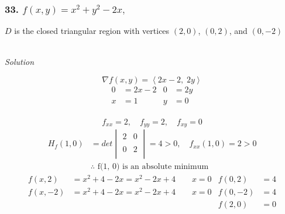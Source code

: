 \documentclass{article}
\newcommand\vv[1]{\left\langle #1 \right\rangle}
\newcommand{\solution}{\centerline{\textit{Solution}}}
\newcommand{\also}{,\quad}
\begin{document}
{{{\subsubsection*{33. $f(x,y) = x^2+y^2-2x,\quad$}
$D$ is the closed triangular
region with vertices $(2,0)$, $(0,2)$, and $(0,-2)$ \\\\
\solution
\vspace{1em}
\[
    \nabla f(x,y) = \vv{2x-2,\; 2y}
\]
\begin{align*}
    0 &= 2x- 2 & 0 &= 2y \\
    x &= 1 & y &= 0
\end{align*}
 \\
\[
    f_{xx}=2\also f_{yy} = 2\also f_{xy} = 0
\]
\begin{align*}
    H_f(1,0) &= det\begin{vmatrix}
    2 & 0 \\\\
    0 & 2 \\
\end{vmatrix} = 4 > 0\also f_{xx}(1,0)=2 > 0 \\
             &\therefore\text{ f(1, 0) is an absolute minimum}
\end{align*}
\begin{align*}
    f(x, 2) &= x^2 + 4 - 2x = x^2 -2x+4\qquad x=0 &  f(0,2) &= 4 \\
    f(x, -2) &= x^2 + 4 - 2x = x^2 -2x+4\qquad x=0 & f(0,-2) &= 4 \\
             & & f(2, 0) &= 0 
\end{align*}
}}}
\end{document}

